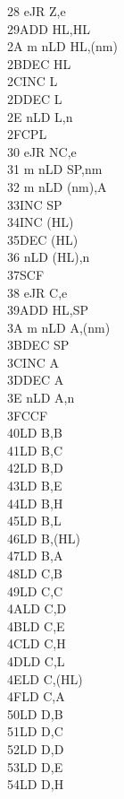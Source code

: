 \begin{multicols}{3}
{\begin{tabbing}
    28 e\>JR Z,e\\
    29\>ADD HL,HL\\
    2A m n\>LD HL,(nm)\\
    2B\>DEC HL\\
    2C\>INC L\\
    2D\>DEC L\\
    2E n\>LD L,n\\
    2F\>CPL\\
    30 e\>JR NC,e\\
    31 m n\>LD SP,nm\\
    32 m n\>LD (nm),A\\
    33\>INC SP\\
    34\>INC (HL)\\
    35\>DEC (HL)\\
    36 n\>LD (HL),n\\
    37\>SCF\\
    38 e\>JR C,e\\
    39\>ADD HL,SP\\
    3A m n\>LD A,(nm)\\
    3B\>DEC SP\\
    3C\>INC A\\
    3D\>DEC A\\
    3E n\>LD A,n\\
    3F\>CCF\\
    40\>LD B,B\\
    41\>LD B,C\\
    42\>LD B,D\\
    43\>LD B,E\\
    44\>LD B,H\\
    45\>LD B,L\\
    46\>LD B,(HL)\\
    47\>LD B,A\\
    48\>LD C,B\\
    49\>LD C,C\\
    4A\>LD C,D\\
    4B\>LD C,E\\
    4C\>LD C,H\\
    4D\>LD C,L\\
    4E\>LD C,(HL)\\
    4F\>LD C,A\\
    50\>LD D,B\\
    51\>LD D,C\\
    52\>LD D,D\\
    53\>LD D,E\\
    54\>LD D,H\\

\end{tabbing}}
\end{multicols}
